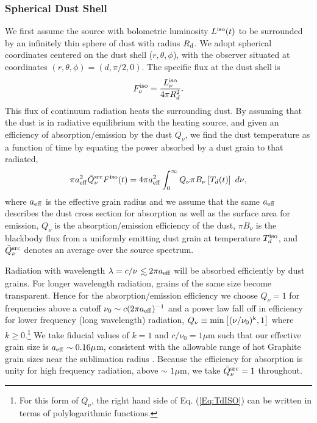 \subsubsection{Spherical Dust Shell}

We first assume the source with bolometric luminosity $L^{\rm iso}(t)$ to be
surrounded by an infinitely thin sphere of dust with radius $R_{\rm{d}}$. We adopt spherical
coordinates centered on the dust shell ($r,\theta,\phi$), with the observer
situated at coordinates $(r,  \theta, \phi) = (d, \pi/2, 0)$. The specific
flux at the dust shell is
\begin{equation}
F^{\rm iso}_{\nu} = \frac{L^{\rm iso}_{\nu}}{4 \pi R^2_d}.
\end{equation}
This flux of continuum radiation heats the surrounding dust. By assuming that
the dust is in radiative equilibrium with the heating source, and given an
efficiency of absorption/emission by the dust $Q_{\nu}$, we find the dust
temperature as a function of time by equating the power absorbed by a dust
grain to that radiated,
\begin{eqnarray}
\pi a^2_{\rm{eff}}\bar{Q}^{\rm src}_{\nu} F^{\rm iso}(t) = 4\pi a^2_{\rm eff} \int^{\infty}_{0}{Q_{\nu} \pi B_{\nu}\left[T_d(t)\right] \ d \nu } ,
\label{Eq:TdISO}
\end{eqnarray}
where $a_{\rm eff}$ is the effective grain radius and we assume that the same
$a_{\rm{eff}}$ describes the dust cross section for absorption as well as the
surface area for emission, $Q_{\nu}$ is the absorption/emission efficiency of
the dust, $\pi B_{\nu}$ is the blackbody flux from a uniformly emitting dust
grain at temperature $T^{\rm iso}_d$, and $\bar{Q}^{\rm src}_{\nu}$ denotes an
average over the source spectrum.

Radiation with wavelength $\lambda = c/\nu \lsim 2 \pi a_{\eff}$ will be
absorbed efficiently by dust grains. For longer wavelength radiation, grains of
the same size become transparent.  Hence for the absorption/emission
efficiency we choose $Q_{\nu}=1$ for frequencies above a cutoff $\nu_0 \sim c
(2 \pi a_{\rm{eff}})^{-1}$ and a power law fall off in efficiency for lower
frequency (long wavelength) radiation, $Q_{\nu} \equiv \rm{min}\left[
(\nu/\nu_0)^k, 1\right]$ where $k \geq 0$.\footnote{ For this form of
$Q_{\nu}$, the right hand side of Eq. (\ref{Eq:TdISO}) can be written in terms
of polylogarithmic functions.} We take fiducial values of $k=1$ and $c/\nu_0 =
1\mu$m such that our effective grain size is $a_{\rm{eff}} \sim 0.16 \mu$m,
consistent with the allowable range of hot Graphite grain sizes near the
sublimation radius \citep{LaorDraine:1993, MorNetzer:2012}. Because the
efficiency for absorption is unity for high frequency radiation, above $\sim$
$1\mu$m, we take $\bar{Q}^{\rm src}_{\nu} = 1$ throughout.


